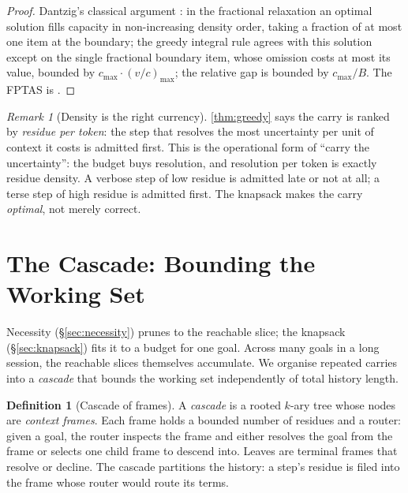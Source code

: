 \documentclass[11pt,a4paper]{article}
\theoremstyle{thmstyle}
\theoremstyle{definition}
\newtheorem{definition}[theorem]{Definition}
\theoremstyle{remark}
\newtheorem{remark}[theorem]{Remark}
\newcommand{\budget}{B}
\newcommand{\val}{v}                    %
\newcommand{\cost}{c}                   %
\begin{document}
\begin{proof}
Dantzig's classical argument \citep{dantzig1957}: in the fractional relaxation an
optimal solution fills capacity in non-increasing density order, taking a
fraction of at most one item at the boundary; the greedy integral rule agrees
with this solution except on the single fractional boundary item, whose omission
costs at most its value, bounded by $\cost_{\max}\cdot(\val/\cost)_{\max}$; the
relative gap is bounded by $\cost_{\max}/\budget$. The FPTAS is \citet{sahni1975}.
\end{proof}

\begin{remark}[Density is the right currency]
\label{rem:density}
\cref{thm:greedy} says the carry is ranked by \emph{residue per token}: the step
that resolves the most uncertainty per unit of context it costs is admitted
first. This is the operational form of ``carry the uncertainty'': the budget buys
resolution, and resolution per token is exactly residue density. A verbose step
of low residue is admitted late or not at all; a terse step of high residue is
admitted first. The knapsack makes the carry \emph{optimal}, not merely correct.
\end{remark}

\section{The Cascade: Bounding the Working Set}
\label{sec:cascade}

Necessity (\S\ref{sec:necessity}) prunes to the reachable slice; the knapsack
(\S\ref{sec:knapsack}) fits it to a budget for one goal. Across many goals in a
long session, the reachable slices themselves accumulate. We organise repeated
carries into a \emph{cascade} that bounds the working set independently of total
history length.

\begin{definition}[Cascade of frames]
\label{def:cascade}
A \emph{cascade} is a rooted $k$-ary tree whose nodes are \emph{context frames}.
Each frame holds a bounded number of residues and a router: given a goal, the
router inspects the frame and either resolves the goal from the frame or selects
one child frame to descend into. Leaves are terminal frames that resolve or
decline. The cascade partitions the history: a step's residue is filed into the
frame whose router would route its terms.
\end{definition}
\end{document}

